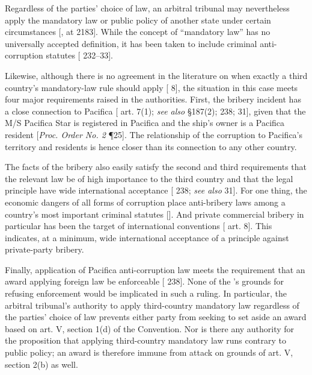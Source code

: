 Regardless of the parties' choice of law, an arbitral tribunal may nevertheless apply the mandatory law or public policy of another state under certain circumstances [\cite{Born 2009}, at 2183].  While the concept of ``mandatory law'' has no universally accepted definition, it has been taken to include criminal anti-corruption statutes [\seeeg \cite{Sayed} 232--33].

Likewise, although there is no agreement in the literature on when exactly a third country's mandatory-law rule should apply [\cite{Bermann} 8], the situation in this case meets four major requirements raised in the authorities.  First, the bribery incident has a close connection to Pacifica [\cite{Rome Convention} art. 7(1); \textit{see also} \cite{Restatement (2d) of Conflict of Laws} \S 187(2); \cite{Barraclough & Waincymer} 238; \cite{Blessing} 31], given that the M/S Pacifica Star is registered in Pacifica and the ship's owner is a Pacifica resident [\textit{Proc. Order No. 2} \P 25].  The relationship of the corruption to Pacifica's territory and residents is hence closer than its connection to any other country.

The facts of the bribery also easily satisfy the second and third requirements that the relevant law be of high importance to the third country and that the legal principle have wide international acceptance [\cite{Barraclough & Waincymer} 238; \textit{see also} \cite{Blessing} 31].  For one thing, the economic dangers of all forms of corruption place anti-bribery laws among a country's most important criminal statutes [\seeeg \cite{Mauro}].  And private commercial bribery in particular has been the target of international conventions [\seeeg \cite{CoE Corruption Convention} art. 8].  This indicates, at a minimum, wide international acceptance of a principle against private-party bribery.

Finally, application of Pacifica anti-corruption law meets the requirement that an award applying foreign law be enforceable [\cite{Barraclough & Waincymer} 238].  None of the 's grounds for refusing enforcement would be implicated in such a ruling.  In particular, the arbitral tribunal's authority to apply third-country mandatory law regardless of the parties' choice of law prevents either party from seeking to set aside an award based on art. V, section 1(d) of the Convention.  Nor is there any authority for the proposition that applying third-country mandatory law runs contrary to public policy; an award is therefore immune from attack on grounds of art. V, section 2(b) as well.

